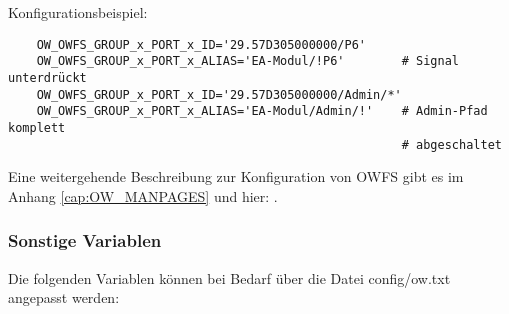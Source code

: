 \begin{description}
Konfigurationsbeispiel:
\begin{example}
\begin{verbatim}
    OW_OWFS_GROUP_x_PORT_x_ID='29.57D305000000/P6'
    OW_OWFS_GROUP_x_PORT_x_ALIAS='EA-Modul/!P6'        # Signal unterdrückt
    OW_OWFS_GROUP_x_PORT_x_ID='29.57D305000000/Admin/*'
    OW_OWFS_GROUP_x_PORT_x_ALIAS='EA-Modul/Admin/!'    # Admin-Pfad komplett
                                                       # abgeschaltet
\end{verbatim}
\end{example}

Eine weitergehende Beschreibung zur Konfiguration von OWFS gibt es im Anhang
\glqq{}\ref{cap:OW_MANPAGES}\grqq{} und hier: .

\end{description}

{
\subsubsection{Sonstige Variablen}
}
Die folgenden Variablen können bei Bedarf über die Datei config/ow.txt angepasst
werden:


